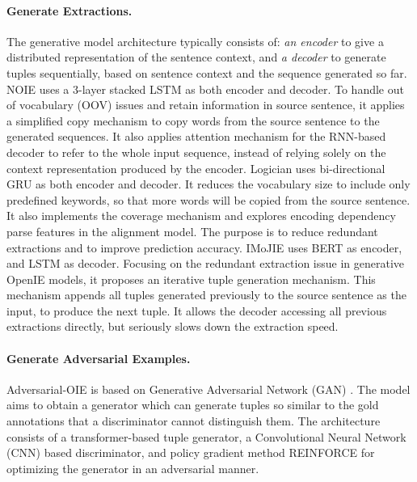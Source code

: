 \documentclass{article}
\begin{document}
\paragraph{Generate Extractions.} The generative model architecture typically consists of: \textit{an encoder} to give a distributed representation of the sentence context, and \textit{a decoder} to generate tuples sequentially, based on sentence context and the sequence generated so far. NOIE \cite{cui-etal-2018-neural} uses a 3-layer stacked LSTM as both encoder and decoder. To handle out of vocabulary (OOV) issues and retain information in source sentence, it applies a simplified copy mechanism \cite{gu-etal-2016-incorporating} to copy words from the source sentence to the generated sequences. It also applies attention mechanism \cite{bahdanau2015neural} for the RNN-based decoder to refer to the whole input sequence, instead of relying solely on the context representation produced by the encoder. Logician \cite{sun2018logician} uses bi-directional GRU \cite{cho-etal-2014-learning} as both encoder and decoder. It reduces the vocabulary size to include only predefined keywords, so that more words will be copied from the source sentence. It also implements the coverage mechanism \cite{tu-etal-2016-modeling} and explores encoding dependency parse features in the alignment model. The purpose is to reduce redundant extractions and to improve prediction accuracy. IMoJIE \cite{kolluru-etal-2020-imojie} uses BERT as encoder, and LSTM as decoder. Focusing on the redundant extraction issue in generative OpenIE models, it proposes an iterative tuple generation mechanism. This mechanism appends all tuples generated previously to the source sentence as the input, to produce the next tuple. It allows the decoder accessing all previous extractions directly, but seriously slows down the extraction speed.

\paragraph{Generate Adversarial Examples.} Adversarial-OIE \cite{han2021generative} is based on Generative Adversarial Network (GAN) \cite{Goodfellow2014GenerativeAN}. The model aims to obtain a generator which can generate tuples so similar to the gold annotations that a discriminator cannot distinguish them. The architecture consists of a transformer-based tuple generator, a Convolutional Neural Network (CNN) based discriminator, and policy gradient method REINFORCE \cite{Williams1992SimpleSG} for optimizing the generator in an adversarial manner.
\end{document}
